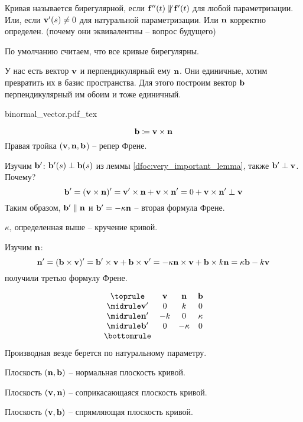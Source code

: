 \documentclass[main]{subfiles}
\begin{document}
\begin{definition}
    Кривая называется бирегулярной, если $\mathbf{f}''(t) \not\parallel \mathbf{f}'(t)$ для любой параметризации.
    Или, если $\mathbf{v}'(s) \neq 0$ для натуральной параметризации.
    Или $\mathbf{n}$ корректно определен.
    (почему они эквивалентны -- вопрос будущего)
\end{definition}

По умолчанию считаем, что все кривые бирегулярны.

У нас есть вектор $\mathbf{v}$ и перпендикулярный ему $\mathbf{n}$.
Они единичные, хотим превратить их в базис пространства.
Для этого построим вектор $\mathbf{b}$ перпендикулярный им обоим и тоже единичный.
\begin{center}
    {binormal_vector.pdf_tex}
\end{center}

\begin{definition}
    \[\mathbf{b} \coloneqq \mathbf{v} \times \mathbf{n}\]
    Правая тройка $(\mathbf{v},\mathbf{n}, \mathbf{b}$) -- репер Френе.
\end{definition}

Изучим $\mathbf{b}'$:
$\mathbf{b}'(s) \perp \mathbf{b}(s)$ из леммы \ref{dfoc:very_important_lemma},
также $\mathbf{b}' \perp \mathbf{v}$. Почему?
\[\mathbf{b}' = (\mathbf{v} \times \mathbf{n})' = \mathbf{v}' \times \mathbf{n} + \mathbf{v}\times \mathbf{n}' = 0 + \mathbf{v}\times \mathbf{n}' \perp \mathbf{v}\]
Таким образом, $\mathbf{b}' \parallel \mathbf{n}$ и $\mathbf{b}' = -\kappa \mathbf{n}$ -- вторая формула Френе.
\begin{definition}
    $\kappa$, определенная выше -- кручение кривой.
\end{definition}

Изучим $\mathbf{n}$:
\[\mathbf{n}' = (\mathbf{b} \times \mathbf{v})' = \mathbf{b}' \times \mathbf{v} + \mathbf{b} \times \mathbf{v}' = -\kappa \mathbf{n} \times \mathbf{v} + \mathbf{b} \times k\mathbf{n} = \kappa\mathbf{b} - k\mathbf{v}\]
получили третью формулу Френе.
\begin{definition}
    \[
        \begin{array}{cccc}
            \toprule
                 & \vv & \vn     & \vb    \\ \midrule
            \vv' & 0   & k       & 0      \\ \midrule
            \vn' & -k  & 0       & \kappa \\ \midrule
            \vb' & 0   & -\kappa & 0      \\
            \bottomrule
        \end{array}
    \]
    Производная везде берется по натуральному параметру.
\end{definition}
\begin{definition}
    Плоскость $(\mathbf{n}, \mathbf{b})$ -- нормальная плоскость кривой.
\end{definition}
\begin{definition}
    Плоскость $(\mathbf{v}, \mathbf{n})$ -- соприкасающаяся плоскость кривой.
\end{definition}
\begin{definition}
    Плоскость $(\mathbf{v}, \mathbf{b})$ -- спрямляющая плоскость кривой.
\end{definition}
\end{document}
